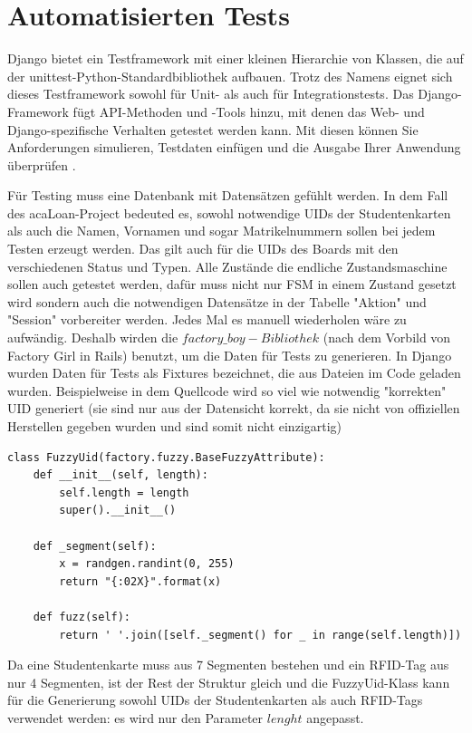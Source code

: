\section{Automatisierten Tests}
\label{sec:testing}
Django bietet ein Testframework mit einer kleinen Hierarchie von Klassen, die auf der unittest-Python-Standardbibliothek aufbauen. Trotz des Namens eignet sich dieses Testframework sowohl für Unit- als auch für Integrationstests. Das Django-Framework fügt API-Methoden und -Tools hinzu, mit denen das Web- und Django-spezifische Verhalten getestet werden kann. Mit diesen können Sie Anforderungen simulieren, Testdaten einfügen und die Ausgabe Ihrer Anwendung überprüfen \cite{website:djangoTest}.

Für Testing muss eine Datenbank mit Datensätzen gefühlt werden. In dem Fall des acaLoan-Project bedeuted es, sowohl notwendige UIDs der Studentenkarten als auch die Namen, Vornamen und sogar Matrikelnummern sollen bei jedem Testen erzeugt werden. Das gilt auch für die UIDs des Boards mit den verschiedenen Status und Typen. Alle Zustände die endliche Zustandsmaschine sollen auch getestet werden, dafür muss nicht nur FSM in einem Zustand gesetzt wird sondern auch die notwendigen Datensätze in der Tabelle "Aktion" und "Session" vorbereiter werden. Jedes Mal es manuell wiederholen wäre zu aufwändig. Deshalb wirden die $factory\_boy-Bibliothek$ (nach dem Vorbild von Factory Girl in Rails) benutzt, um die Daten für Tests zu generieren. In Django wurden Daten für Tests als Fixtures bezeichnet, die aus Dateien im Code geladen wurden. Beispielweise in dem Quellcode wird so viel wie notwendig "korrekten" UID generiert (sie sind nur aus der Datensicht korrekt, da sie nicht von offiziellen Herstellen gegeben wurden und sind somit nicht einzigartig)

\begin{lstlisting}[caption={Factory für UIDs},captionpos=b]
class FuzzyUid(factory.fuzzy.BaseFuzzyAttribute):
	def __init__(self, length):
		self.length = length
		super().__init__()
		
	def _segment(self):
		x = randgen.randint(0, 255)
		return "{:02X}".format(x)
	
	def fuzz(self):
		return ' '.join([self._segment() for _ in range(self.length)])
\end{lstlisting}

Da eine Studentenkarte muss aus 7 Segmenten bestehen und ein RFID-Tag aus nur 4 Segmenten, ist der Rest der Struktur gleich und die FuzzyUid-Klass kann für die Generierung sowohl UIDs der Studentenkarten als auch RFID-Tags verwendet werden: es wird nur den Parameter $lenght$ angepasst.

